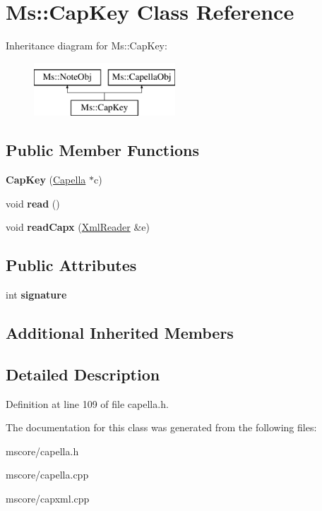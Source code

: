 \hypertarget{class_ms_1_1_cap_key}{}\section{Ms\+:\+:Cap\+Key Class Reference}
\label{class_ms_1_1_cap_key}
Inheritance diagram for Ms\+:\+:Cap\+Key\+:\begin{figure}[H]
\begin{center}
\leavevmode
\includegraphics[height=2.000000cm]{class_ms_1_1_cap_key}
\end{center}
\end{figure}
\subsection*{Public Member Functions}
\begin{DoxyCompactItemize}
\item 
\mbox{\label{class_ms_1_1_cap_key_a070bfebecc34441c9b401374bed12d3f}} 
{\bfseries Cap\+Key} (\hyperlink{class_ms_1_1_capella}{Capella} $\ast$c)
\item 
\mbox{\label{class_ms_1_1_cap_key_a50f0a8f75a9c1636341efc5d95b2116a}} 
void {\bfseries read} ()
\item 
\mbox{\label{class_ms_1_1_cap_key_a944587ebfcf6c70fa2eb0d6015994fee}} 
void {\bfseries read\+Capx} (\hyperlink{class_ms_1_1_xml_reader}{Xml\+Reader} \&e)
\end{DoxyCompactItemize}
\subsection*{Public Attributes}
\begin{DoxyCompactItemize}
\item 
\mbox{\label{class_ms_1_1_cap_key_aa5f7d6e3803f9b5e7d37f0df1f1e4d0b}} 
int {\bfseries signature}
\end{DoxyCompactItemize}
\subsection*{Additional Inherited Members}


\subsection{Detailed Description}


Definition at line 109 of file capella.\+h.



The documentation for this class was generated from the following files\+:\begin{DoxyCompactItemize}
\item 
mscore/capella.\+h\item 
mscore/capella.\+cpp\item 
mscore/capxml.\+cpp\end{DoxyCompactItemize}
